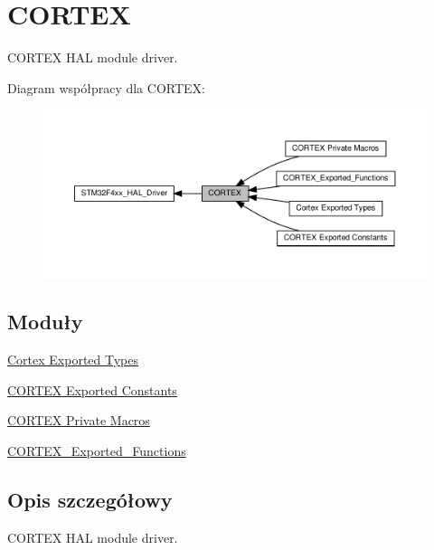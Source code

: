 \hypertarget{group___c_o_r_t_e_x}{}\section{C\+O\+R\+T\+EX}
\label{group___c_o_r_t_e_x}


C\+O\+R\+T\+EX H\+AL module driver.  


Diagram współpracy dla C\+O\+R\+T\+EX\+:\nopagebreak
\begin{figure}[H]
\begin{center}
\leavevmode
\includegraphics[width=350pt]{group___c_o_r_t_e_x}
\end{center}
\end{figure}
\subsection*{Moduły}
\begin{DoxyCompactItemize}
\item 
\hyperlink{group___c_o_r_t_e_x___exported___types}{Cortex Exported Types}
\item 
\hyperlink{group___c_o_r_t_e_x___exported___constants}{C\+O\+R\+T\+E\+X Exported Constants}
\item 
\hyperlink{group___c_o_r_t_e_x___private___macros}{C\+O\+R\+T\+E\+X Private Macros}
\item 
\hyperlink{group___c_o_r_t_e_x___exported___functions}{C\+O\+R\+T\+E\+X\+\_\+\+Exported\+\_\+\+Functions}
\end{DoxyCompactItemize}


\subsection{Opis szczegółowy}
C\+O\+R\+T\+EX H\+AL module driver. 

